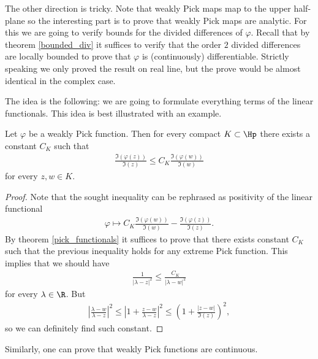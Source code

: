 The other direction is tricky. Note that weakly Pick maps map to the upper half-plane so the interesting part is to prove that weakly Pick maps are analytic. For this we are going to verify bounds for the divided differences of $\varphi$. Recall that by theorem \ref{bounded_div} it suffices to verify that the order $2$ divided differences are locally bounded to prove that $\varphi$ is (continuously) differentiable. Strictly speaking we only proved the result on real line, but the prove would be almost identical in the complex case.

The idea is the following: we are going to formulate everything terms of the linear functionals. This idea is best illustrated with an example.

\begin{lem}\label{pick_harnack_lemma}
	Let $\varphi$ be a weakly Pick function. Then for every compact $K \subset \Hp$ there exists a constant $C_{K}$ such that
	\begin{align*}
		\frac{\Im(\varphi(z))}{\Im(z)} \leq C_{K} \frac{\Im(\varphi(w))}{\Im(w)}
	\end{align*}
	for every $z, w \in K$.
\end{lem}
\begin{proof}
	Note that the sought inequality can be rephrased as positivity of the linear functional
	\begin{align*}
		\varphi \mapsto C_{K} \frac{\Im(\varphi(w))}{\Im(w)} - \frac{\Im(\varphi(z))}{\Im(z)}.
	\end{align*}
	By theorem \ref{pick_functionals} it suffices to prove that there exists constant $C_{K}$ such that the previous inequality holds for any extreme Pick function. This implies that we should have
	\begin{align*}
		\frac{1}{|\lambda - z|^2} \leq \frac{C_{K}}{|\lambda - w|^2}
	\end{align*}
	for every $\lambda \in \R$. But
	\begin{align*}
		\left|\frac{\lambda - w}{\lambda - z}\right|^2 \leq \left|1 + \frac{z - w}{\lambda - z}\right|^2 \leq \left(1 + \frac{|z - w|}{\Im(z)}\right)^2,
	\end{align*}
	so we can definitely find such constant.
\end{proof}

Similarly, one can prove that weakly Pick functions are continuous.

